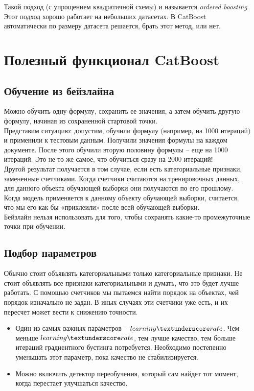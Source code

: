 \documentclass[a4paper,12pt]{article}
\begin{document}
Такой подход (с упрощением квадратичной схемы) и называется \textit{ordered boosting}. Этот подход хорошо работает на небольших датасетах. В CatBoost автоматически по размеру датасета решается, брать этот метод, или нет. 

\section{Полезный функционал CatBoost}
\subsection{Обучение из бейзлайна}
Можно обучить одну формулу, сохранить ее значения, а затем обучить другую формулу, начиная из сохраненной стартовой точки. \\

Представим ситуацию: допустим, обучили формулу (например, на 1000 итераций) и применили к тестовым данным. Получили значения формулы на каждом документе. После этого обучили вторую половину формулы – еще на 1000 итераций. Это не то же самое, что обучиться сразу на 2000 итераций! \\

Другой результат получается в том случае, если есть категориальные признаки, замененные счетчиками. Когда счетчики считаются на тренировочных данных, для данного объекта обучающей выборки они получаются по его прошлому. Когда модель применяется к данному объекту обучающей выборки, считается, что мы его как бы «приклеили» после всей обучающей выборки. \\

Бейзлайн нельзя использовать для того, чтобы сохранять какие-то промежуточные точки при обучении.

\subsection{Подбор параметров}
Обычно стоит объявлять категориальными только категориальные признаки. Не стоит объявлять все признаки категориальными и думать, что это будет лучше работать. С помощью счетчиков мы пытаемся найти порядок на объектах, чей порядок изначально не задан. В иных случаях эти счетчики уже есть, и их пересчет может вести к снижению точности. 

\begin{itemize}[noitemsep]
\item Один из самых важных параметров – $learning\textunderscore rate$. Чем меньше $learning \textunderscore rate$, тем лучше качество, тем больше итераций градиентного бустинга потребуется. Необходимо постепенно уменьшать этот параметр, пока качество не стабилизируется. 
\item Можно включить детектор переобучения, который сам найдет тот момент, когда перестает улучшаться качество. 
\end{itemize}
\end{document}
